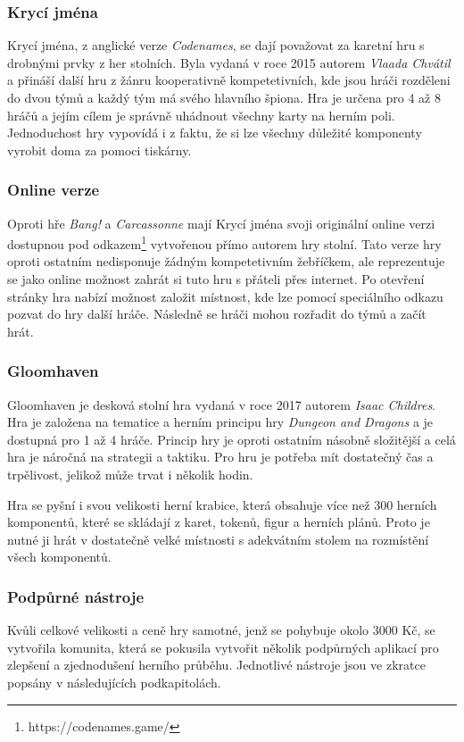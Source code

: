 \subsubsection{Krycí jména}
\label{subsubsec:popular-board-games-analysis-codenames}
Krycí jména, z anglické verze \textit{Codenames}, se dají považovat za karetní hru s drobnými prvky z her stolních. Byla vydaná v roce 2015 autorem \textit{Vlaada Chvátil} a přináší další hru z žánru kooperativně kompetetivních, kde jsou hráči rozděleni do dvou týmů a každý tým má svého hlavního špiona. Hra je určena pro 4 až 8 hráčů a jejím cílem je správně uhádnout všechny karty na herním poli. Jednoduchost hry vypovídá i z faktu, že si lze všechny důležité komponenty vyrobit doma za pomoci tiskárny.

\subsubsection*{Online verze}
\label{subsubsec:popular-board-games-analysis-codenames-online}
Oproti hře \textit{Bang!} a \textit{Carcassonne} mají Krycí jména svoji originální online verzi dostupnou pod odkazem\footnote{https://codenames.game/} vytvořenou přímo autorem hry stolní. Tato verze hry oproti ostatním nedisponuje žádným kompetetivním žebříčkem, ale reprezentuje se jako online možnost zahrát si tuto hru s přáteli přes internet. Po otevření stránky hra nabízí možnost založit místnost, kde lze pomocí speciálního odkazu pozvat do hry další hráče. Následně se hráči mohou rozřadit do týmů a začít hrát.

\subsubsection{Gloomhaven}
\label{subsubsec:popular-board-games-analysis-gloomhaven}
Gloomhaven je desková stolní hra vydaná v roce 2017 autorem \textit{Isaac Childres}. Hra je založena na tematice a herním principu hry \textit{Dungeon and Dragons} a je dostupná pro 1 až 4 hráče. Princip hry je oproti ostatním násobně složitější a celá hra je náročná na strategii a taktiku. Pro hru je potřeba mít dostatečný čas a trpělivost, jelikož může trvat i několik hodin.

Hra se pyšní i svou velikosti herní krabice, která obsahuje více než 300 herních komponentů, které se skládají z karet, tokenů, figur a herních plánů. Proto je nutné ji hrát v dostatečně velké místnosti s adekvátním stolem na rozmístění všech komponentů.

\subsubsection*{Podpůrné nástroje}
\label{subsubsec:popular-board-games-analysis-gloomhaven-support-tools}
Kvůli celkové velikosti a ceně hry samotné, jenž se pohybuje okolo 3000 Kč, se vytvořila komunita, která se pokusila vytvořit několik podpůrných aplikací pro zlepšení a zjednodušení herního průběhu. Jednotlivé nástroje jsou ve zkratce popsány v následujících podkapitolách.

